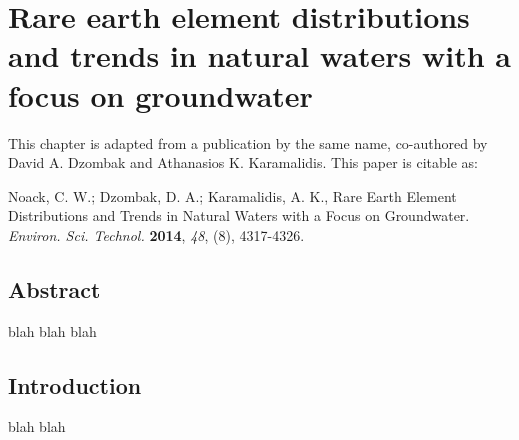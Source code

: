 \chapter{Rare earth element distributions and trends in natural waters with a focus on groundwater}

This chapter is adapted from a publication by the same name, co-authored by David A. Dzombak and Athanasios K. Karamalidis.
This paper is citable as: 

Noack, C. W.; Dzombak, D. A.; Karamalidis, A. K., Rare Earth Element Distributions and Trends in Natural Waters with a Focus on Groundwater. \textit{Environ. Sci. Technol.} \textbf{2014}, \textit{48}, (8), 4317-4326.

\clearpage

\section*{Abstract}
blah blah blah


\section{Introduction}

blah blah